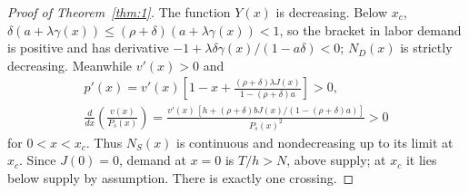 \documentclass[12pt]{article}
\theoremstyle{plain}
\theoremstyle{definition}
\theoremstyle{remark}
\begin{document}
\begin{proof}[Proof of Theorem~\ref{thm:1}]
The function $Y(x)$ is decreasing. Below $x_c$, $\delta(a+\lambda\gamma(x))\le(\rho+\delta)(a+\lambda\gamma(x))<1$, so the bracket in labor demand is positive and has derivative $-1+\lambda\delta\gamma(x)/(1-a\delta)<0$; $N_D(x)$ is strictly decreasing. Meanwhile $v'(x)>0$ and
\begin{gather*}
p'(x)=v'(x)\left[1-x+\frac{(\rho+\delta)\lambda J(x)}{1-(\rho+\delta)a}\right]>0,\\
\frac{d}{dx}\left(\frac{v(x)}{P_s(x)}\right)=\frac{v'(x)\,[h+(\rho+\delta)bJ(x)/(1-(\rho+\delta)a)]}{P_s(x)^2}>0
\end{gather*}
for $0<x<x_c$. Thus $N_S(x)$ is continuous and nondecreasing up to its limit at $x_c$. Since $J(0)=0$, demand at $x=0$ is $T/h>N$, above supply; at $x_c$ it lies below supply by assumption. There is exactly one crossing.


\end{proof}
\end{document}
